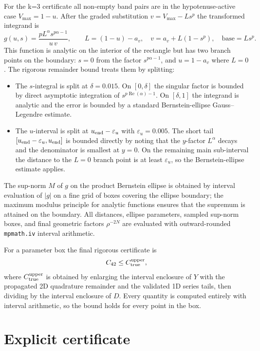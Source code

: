 \documentclass[11pt]{article}
\theoremstyle{plain}
\DeclareMathOperator{\Repart}{Re}
\begin{document}
For the k=3 certificate all non-empty band pairs are in the hypotenuse-active case $V_{\max}=1-u$.  After the graded substitution $v=V_{\max}-Ls^p$ the transformed integrand is
\[
g(u,s)=\frac{pL^{\alpha}s^{p\alpha-1}}{u\,v},\qquad
L=(1-u)-a_v,\quad v=a_v+L(1-s^p),\quad \text{base}=Ls^p.
\]
This function is analytic on the interior of the rectangle but has two branch points on the boundary: $s=0$ from the factor $s^{p\alpha-1}$, and $u=1-a_v$ where $L=0$.  The rigorous remainder bound treats them by splitting:

\begin{itemize}
\item The $s$-integral is split at $\delta=0.015$.  On $[0,\delta]$ the singular factor is bounded by direct asymptotic integration of $s^{p\Repart(\alpha)-1}$.  On $[\delta,1]$ the integrand is analytic and the error is bounded by a standard Bernstein-ellipse Gauss--Legendre estimate.
\item The $u$-interval is split at $u_{\rm end}-\varepsilon_u$ with $\varepsilon_u=0.005$.  The short tail $[u_{\rm end}-\varepsilon_u,u_{\rm end}]$ is bounded directly by noting that the $y$-factor $L^{\alpha}$ decays and the denominator is smallest at $y=0$.  On the remaining main sub-interval the distance to the $L=0$ branch point is at least $\varepsilon_u$, so the Bernstein-ellipse estimate applies.
\end{itemize}

The sup-norm $M$ of $g$ on the product Bernstein ellipse is obtained by interval evaluation of $|g|$ on a fine grid of boxes covering the ellipse boundary; the maximum modulus principle for analytic functions ensures that the supremum is attained on the boundary.  All distances, ellipse parameters, sampled sup-norm boxes, and final geometric factors $\rho^{-2N}$ are evaluated with outward-rounded \texttt{mpmath.iv} interval arithmetic.

For a parameter box the final rigorous certificate is
\[
C_{42}\le C_{\rm true}^{\rm upper},
\]
where $C_{\rm true}^{\rm upper}$ is obtained by enlarging the interval enclosure of $Y$ with the propagated 2D quadrature remainder and the validated 1D series tails, then dividing by the interval enclosure of $D$.  Every quantity is computed entirely with interval arithmetic, so the bound holds for every point in the box.

\section{Explicit certificate}\label{sec:certificate}
\end{document}
